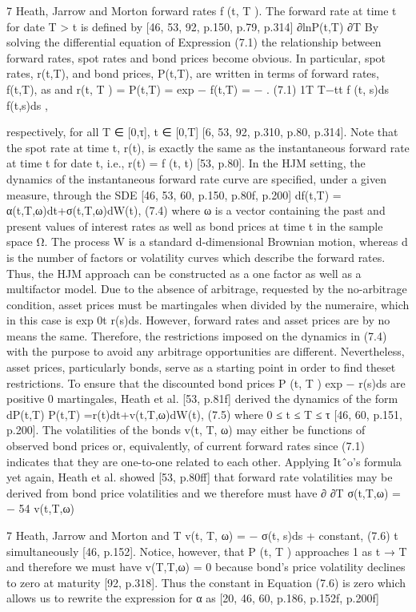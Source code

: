 7 Heath, Jarrow and Morton
forward rates f (t, T ). The forward rate at time t for date T > t is defined by [46, 53, 92, p.150, p.79, p.314]
∂lnP(t,T) ∂T
By solving the differential equation of Expression (7.1) the relationship between forward rates, spot rates and bond prices become obvious. In particular, spot rates, r(t,T), and bond prices, P(t,T), are written in terms of forward rates, f(t,T), as
and
r(t, T ) = P(t,T) = exp −
f(t,T) = −
. (7.1)
1T T−tt
f (t, s)ds 
f(t,s)ds ,

respectively, for all T ∈ [0,τ], t ∈ [0,T] [6, 53, 92, p.310, p.80, p.314]. Note that the spot rate at time t, r(t), is exactly the same as the instantaneous forward rate at time t for date t, i.e., r(t) = f (t, t) [53, p.80].
In the HJM setting, the dynamics of the instantaneous forward rate curve are specified, under a given measure, through the SDE [46, 53, 60, p.150, p.80f, p.200]
df(t,T) = α(t,T,ω)dt+σ(t,T,ω)dW(t), (7.4)
where ω is a vector containing the past and present values of interest rates as well as bond prices at time t in the sample space Ω. The process W is a standard d-dimensional Brownian motion, whereas d is the number of factors or volatility curves which describe the forward rates. Thus, the HJM approach can be constructed as a one factor as well as a multifactor model.
Due to the absence of arbitrage, requested by the no-arbitrage condition, asset prices must
be martingales when divided by the numeraire, which in this case is exp 0t r(s)ds. However,
forward rates and asset prices are by no means the same. Therefore, the restrictions imposed
on the dynamics in (7.4) with the purpose to avoid any arbitrage opportunities are different.
Nevertheless, asset prices, particularly bonds, serve as a starting point in order to find theset
restrictions. To ensure that the discounted bond prices P (t, T ) exp − r(s)ds are positive
0
martingales, Heath et al. [53, p.81f] derived the dynamics of the form dP(t,T)
P(t,T) =r(t)dt+v(t,T,ω)dW(t), (7.5)
where 0 ≤ t ≤ T ≤ τ [46, 60, p.151, p.200]. The volatilities of the bonds v(t, T, ω) may either be functions of observed bond prices or, equivalently, of current forward rates since (7.1) indicates that they are one-to-one related to each other. Applying Itˆo’s formula yet again, Heath et al. showed [53, p.80ff] that forward rate volatilities may be derived from bond price volatilities and we therefore must have
∂ ∂T
σ(t,T,ω) = − 54
v(t,T,ω)

7 Heath, Jarrow and Morton
and T
v(t, T, ω) = − σ(t, s)ds + constant, (7.6)
t
simultaneously [46, p.152]. Notice, however, that P (t, T ) approaches 1 as t → T and therefore we must have v(T,T,ω) = 0 because bond’s price volatility declines to zero at maturity [92, p.318]. Thus the constant in Equation (7.6) is zero which allows us to rewrite the expression for α as [20, 46, 60, p.186, p.152f, p.200f]

